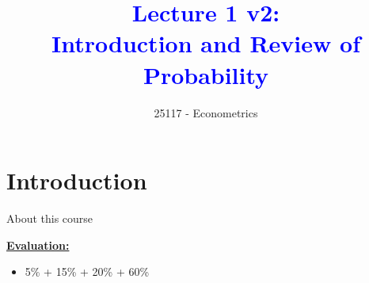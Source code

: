 \documentclass[notes,10pt, aspectratio=169]{beamer}
\title[]{\textcolor{blue}{Lecture 1 v2:\\Introduction and Review of Probability}}
\author{25117 - Econometrics}
\institute[shortinst]{Universitat Pompeu Fabra}
\begin{document}

\begin{frame}[plain]
\maketitle
\end{frame}

\section{Introduction}

\begin{frame}[label=intro_0]{About this course}

\vspace{.3cm}
\underline{\textbf{\large Evaluation:}}\\
\begin{itemize}
    \item[--] \textit{\color{teal}{Participation:}} 5\% + \textit{\color{orange}{Midterm 1:}} 15\% + \textit{\color{orange}{Midterm 2:}} 20\% + \textit{\color{purple}{Cumulative Final Exam:}} 60\%
\end{itemize}

\end{frame}
\end{document}
